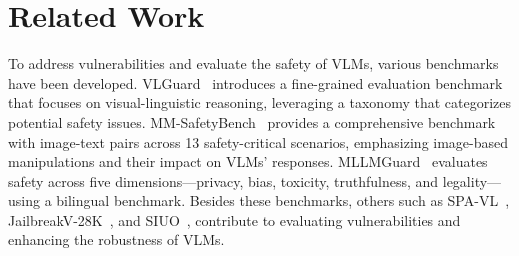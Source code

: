 \section{Related Work}

To address vulnerabilities and evaluate the safety of VLMs, various benchmarks have been developed. VLGuard~\cite{vlguard2024} introduces a fine-grained evaluation benchmark that focuses on visual-linguistic reasoning, leveraging a taxonomy that categorizes potential safety issues. MM-SafetyBench~\cite{mmsafetybench2025} provides a comprehensive benchmark with image-text pairs across 13 safety-critical scenarios, emphasizing image-based manipulations and their impact on VLMs' responses. MLLMGuard~\cite{mllmguard2024} evaluates safety across five dimensions—privacy, bias, toxicity, truthfulness, and legality—using a bilingual benchmark. Besides these benchmarks, others such as SPA-VL~\cite{spavl2024}, JailbreakV-28K~\cite{jailbreak28k2024}, and SIUO~\cite{siuo2024}, contribute to evaluating vulnerabilities and enhancing the robustness of VLMs.

